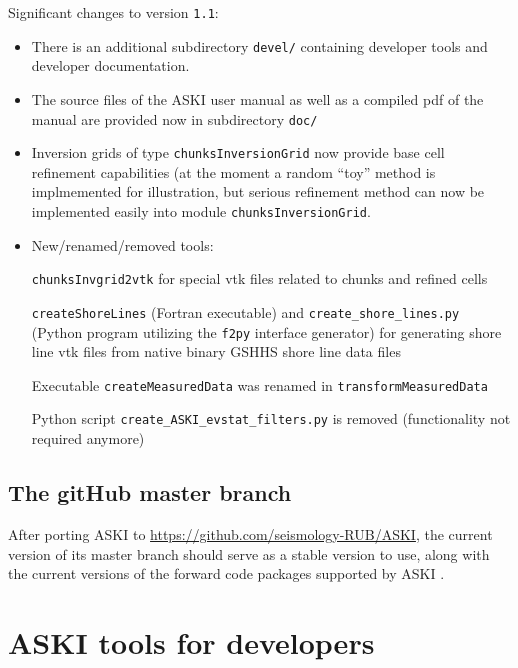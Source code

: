 \documentclass[12pt,a4paper]{article}
\newcommand{\lcode}[1]{\nolinkurl{#1}}
\newcommand{\lcodetitle}[1]{ {\ttfamily #1} }
\newcommand{\ASKI}{ {\ttfamily ASKI} }
\begin{document}
Significant changes to version \lcode{1.1}:
\begin{itemize}
\item 
There is an additional subdirectory \lcode{devel/} containing developer tools and developer documentation.

\item
The source files of the \ASKI{} user manual as well as a compiled pdf of the manual are provided now in subdirectory
\lcode{doc/}

\item 
Inversion grids of type \lcode{chunksInversionGrid} now provide base cell refinement capabilities (at the moment
a random ``toy'' method is implmemented for illustration, but serious refinement method can now be implemented
easily into module \lcode{chunksInversionGrid}.

\item New/renamed/removed tools:

  \lcode{chunksInvgrid2vtk} for special vtk files related to chunks and refined cells 

  \lcode{createShoreLines} (Fortran executable) and \lcode{create_shore_lines.py} (Python program
  utilizing the \lcode{f2py} interface generator) for generating shore line vtk files from native binary GSHHS 
  shore line data files

  Executable \lcode{createMeasuredData} was renamed in \lcode{transformMeasuredData}

  Python script \lcode{create_ASKI_evstat_filters.py} is removed (functionality not required anymore)
\end{itemize}

\subsection*{The \lcodetitle{gitHub} master branch}
After porting \ASKI{} to \url{https://github.com/seismology-RUB/ASKI}, the current version of its master branch should
serve as a stable version to use, along with the current versions of the forward code packages supported by \ASKI{}.

%
\section{\ASKI tools for developers} \label{sec:devel_tools}
%
\end{document}
